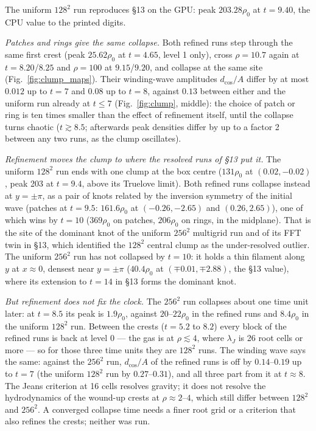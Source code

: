 \documentclass[11pt]{article}
\begin{document}
\noindent
The uniform $128^2$ run reproduces \S13 on the GPU: peak $203.28\rho_0$ at $t = 9.40$, the
CPU value to the printed digits.

\emph{Patches and rings give the same collapse.} Both refined runs step through the same
first crest (peak $25.62\rho_0$ at $t = 4.65$, level 1 only), cross $\rho = 10.7$ again at
$t = 8.20$/$8.25$ and $\rho = 100$ at $9.15$/$9.20$, and collapse at the same site
(Fig.~\ref{fig:clump_maps}). Their winding-wave amplitudes $d_{\cos}/A$ differ by at most
$0.012$ up to $t = 7$ and $0.08$ up to $t = 8$, against $0.13$ between either and the uniform
run already at $t \le 7$ (Fig.~\ref{fig:clump}, middle): the choice of patch or ring is ten
times smaller than the effect of refinement itself, until the collapse turns chaotic
($t \gtrsim 8.5$; afterwards peak densities differ by up to a factor 2 between any two runs,
as the clump oscillates).

\emph{Refinement moves the clump to where the resolved runs of \S13 put it.} The uniform
$128^2$ run ends with one clump at the box centre ($131\rho_0$ at $(0.02, -0.02)$, peak 203
at $t = 9.4$, above its Truelove limit). Both refined runs collapse instead at $y = \pm\pi$, as a
pair of knots related by the inversion symmetry of the initial wave (patches at $t = 9.5$:
$161.6\rho_0$ at $(-0.26, -2.65)$ and $(0.26, 2.65)$), one of which wins by $t = 10$
($369\rho_0$ on patches, $206\rho_0$ on rings, in the midplane). That is the site of the
dominant knot of the uniform $256^2$ multigrid run and of its FFT twin in \S13, which
identified the $128^2$ central clump as the under-resolved outlier. The uniform $256^2$ run has not collapsed by $t = 10$: it holds a thin
filament along $y$ at $x \approx 0$, densest near $y = \pm\pi$ ($40.4\rho_0$ at
$(\mp0.01, \mp2.88)$, the \S13 value), where its extension to $t = 14$ in \S13 forms the
dominant knot.

\emph{But refinement does not fix the clock.} The $256^2$ run collapses about one time unit
later: at $t = 8.5$ its peak is $1.9\rho_0$, against $20$--$22\rho_0$ in the refined runs and
$8.4\rho_0$ in the uniform $128^2$ run. Between the crests ($t = 5.2$ to $8.2$) every block of
the refined runs is back at level 0 --- the gas is at $\rho \lesssim 4$, where $\lambda_J$
is 26 root cells or more --- so for those three time units they are $128^2$ runs. The
winding wave says the same: against the $256^2$ run, $d_{\cos}/A$ of the refined runs is
off by $0.14$--$0.19$ up to $t = 7$ (the uniform $128^2$ run by $0.27$--$0.31$), and all
three part from it at $t \approx 8$. The Jeans criterion at 16 cells resolves gravity; it
does not resolve the hydrodynamics of the wound-up crests at $\rho \approx 2$--$4$, which
still differ between $128^2$ and $256^2$. A converged collapse time needs a finer root grid
or a criterion that also refines the crests; neither was run.
\end{document}
